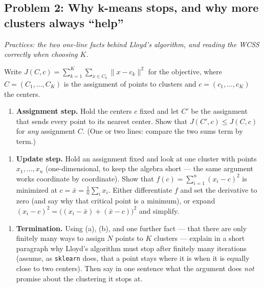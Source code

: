 \documentclass[
  11pt,
]{article}
\providecommand{\tightlist}{%
  \setlength{\itemsep}{0pt}\setlength{\parskip}{0pt}}
\newcommand{\answerspace}[1]{\par\vspace*{#1}}  %
\newcommand{\answerpage}{\clearpage}
\begin{document}
\answerspace{1.8in}

\answerpage

\subsection{Problem 2: Why k-means stops, and why more clusters always
``help''}\label{problem-2-why-k-means-stops-and-why-more-clusters-always-help}

\emph{Practices: the two one-line facts behind Lloyd's algorithm, and
reading the WCSS correctly when choosing \(K\).}

Write \(J(C, c) = \sum_{k=1}^K \sum_{x\in C_k}\|x-c_k\|^2\) for the
objective, where \(C = (C_1,\dots,C_K)\) is the assignment of points to
clusters and \(c = (c_1,\dots,c_K)\) the centers.

\begin{enumerate}
\def\labelenumi{(\alph{enumi})}
\tightlist
\item
  \textbf{Assignment step.} Hold the centers \(c\) fixed and let \(C'\)
  be the assignment that sends every point to its nearest center. Show
  that \(J(C', c) \le J(C, c)\) for \emph{any} assignment \(C\). (One or
  two lines: compare the two sums term by term.)
\end{enumerate}

\answerspace{1.5in}

\begin{enumerate}
\def\labelenumi{(\alph{enumi})}
\setcounter{enumi}{1}
\tightlist
\item
  \textbf{Update step.} Hold an assignment fixed and look at one cluster
  with points \(x_1,\dots,x_n\) (one-dimensional, to keep the algebra
  short --- the same argument works coordinate by coordinate). Show that
  \(f(c) = \sum_{i=1}^n (x_i - c)^2\) is minimized at
  \(c = \bar x = \frac1n\sum_i x_i\). Either differentiate \(f\) and set
  the derivative to zero (and say why that critical point is a minimum),
  or expand \((x_i - c)^2 = \big((x_i-\bar x) + (\bar x - c)\big)^2\)
  and simplify.
\end{enumerate}

\answerspace{2.5in}

\begin{enumerate}
\def\labelenumi{(\alph{enumi})}
\setcounter{enumi}{2}
\tightlist
\item
  \textbf{Termination.} Using (a), (b), and one further fact --- that
  there are only finitely many ways to assign \(N\) points to \(K\)
  clusters --- explain in a short paragraph why Lloyd's algorithm must
  stop after finitely many iterations (assume, as \texttt{sklearn} does,
  that a point stays where it is when it is equally close to two
  centers). Then say in one sentence what the argument does \emph{not}
  promise about the clustering it stops at.
\end{enumerate}
\end{document}
